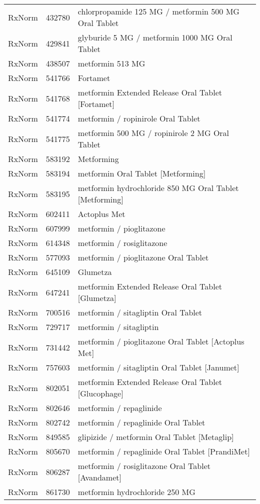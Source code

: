 \begin{longtable}{p{}p{}p{}}
  RxNorm & 432780 & chlorpropamide 125 MG / metformin 500 MG Oral Tablet \\ 
  RxNorm & 429841 & glyburide 5 MG / metformin 1000 MG Oral Tablet \\ 
  RxNorm & 438507 & metformin 513 MG \\ 
  RxNorm & 541766 & Fortamet \\ 
  RxNorm & 541768 & metformin Extended Release Oral Tablet [Fortamet] \\ 
  RxNorm & 541774 & metformin / ropinirole Oral Tablet \\ 
  RxNorm & 541775 & metformin 500 MG / ropinirole 2 MG Oral Tablet \\ 
  RxNorm & 583192 & Metforming \\ 
  RxNorm & 583194 & metformin Oral Tablet [Metforming] \\ 
  RxNorm & 583195 & metformin hydrochloride 850 MG Oral Tablet [Metforming] \\ 
  RxNorm & 602411 & Actoplus Met \\ 
  RxNorm & 607999 & metformin / pioglitazone \\ 
  RxNorm & 614348 & metformin / rosiglitazone \\ 
  RxNorm & 577093 & metformin / pioglitazone Oral Tablet \\ 
  RxNorm & 645109 & Glumetza \\ 
  RxNorm & 647241 & metformin Extended Release Oral Tablet [Glumetza] \\ 
  RxNorm & 700516 & metformin / sitagliptin Oral Tablet \\ 
  RxNorm & 729717 & metformin / sitagliptin \\ 
  RxNorm & 731442 & metformin / pioglitazone Oral Tablet [Actoplus Met] \\ 
  RxNorm & 757603 & metformin / sitagliptin Oral Tablet [Janumet] \\ 
  RxNorm & 802051 & metformin Extended Release Oral Tablet [Glucophage] \\ 
  RxNorm & 802646 & metformin / repaglinide \\ 
  RxNorm & 802742 & metformin / repaglinide Oral Tablet \\ 
  RxNorm & 849585 & glipizide / metformin Oral Tablet [Metaglip] \\ 
  RxNorm & 805670 & metformin / repaglinide Oral Tablet [PrandiMet] \\ 
  RxNorm & 806287 & metformin / rosiglitazone Oral Tablet [Avandamet] \\ 
  RxNorm & 861730 & metformin hydrochloride 250 MG \\ 

\end{longtable}
